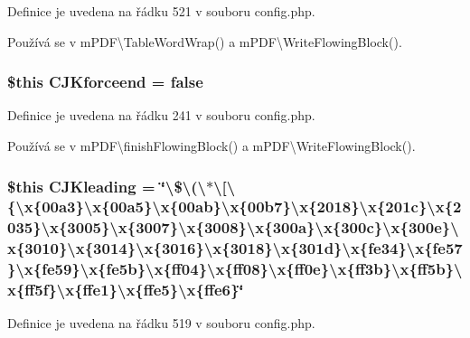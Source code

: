 Definice je uvedena na řádku 521 v souboru config.\-php.



Používá se v m\-P\-D\-F\textbackslash{}\-Table\-Word\-Wrap() a m\-P\-D\-F\textbackslash{}\-Write\-Flowing\-Block().

\hypertarget{config_8php_a115d273cc993d144d858469bfb34d1f5}{
\subsubsection[{C\-J\-Kforceend}]{\setlength{\rightskip}{0pt plus 5cm}\$this C\-J\-Kforceend = {\bf false}}}\label{config_8php_a115d273cc993d144d858469bfb34d1f5}


Definice je uvedena na řádku 241 v souboru config.\-php.



Používá se v m\-P\-D\-F\textbackslash{}finish\-Flowing\-Block() a m\-P\-D\-F\textbackslash{}\-Write\-Flowing\-Block().

\hypertarget{config_8php_a728940c3e918c339351ad1cb52be0a14}{
\subsubsection[{C\-J\-Kleading}]{\setlength{\rightskip}{0pt plus 5cm}\$this C\-J\-Kleading = \char`\"{}\textbackslash{}\$\textbackslash{}(\textbackslash{}$\ast$\textbackslash{}\mbox{[}\textbackslash{}\{\textbackslash{}x\{00a3\}\textbackslash{}x\{00a5\}\textbackslash{}x\{00ab\}\textbackslash{}x\{00b7\}\textbackslash{}x\{2018\}\textbackslash{}x\{201c\}\textbackslash{}x\{2035\}\textbackslash{}x\{3005\}\textbackslash{}x\{3007\}\textbackslash{}x\{3008\}\textbackslash{}x\{300a\}\textbackslash{}x\{300c\}\textbackslash{}x\{300e\}\textbackslash{}x\{3010\}\textbackslash{}x\{3014\}\textbackslash{}x\{3016\}\textbackslash{}x\{3018\}\textbackslash{}x\{301d\}\textbackslash{}x\{fe34\}\textbackslash{}x\{fe57\}\textbackslash{}x\{fe59\}\textbackslash{}x\{fe5b\}\textbackslash{}x\{ff04\}\textbackslash{}x\{ff08\}\textbackslash{}x\{ff0e\}\textbackslash{}x\{ff3b\}\textbackslash{}x\{ff5b\}\textbackslash{}x\{ff5f\}\textbackslash{}x\{ffe1\}\textbackslash{}x\{ffe5\}\textbackslash{}x\{ffe6\}\char`\"{}}}\label{config_8php_a728940c3e918c339351ad1cb52be0a14}


Definice je uvedena na řádku 519 v souboru config.\-php.



